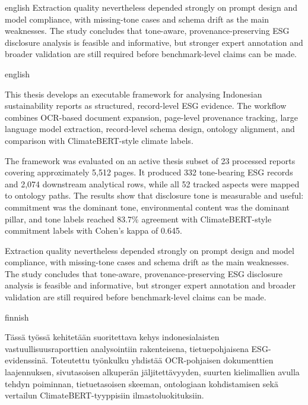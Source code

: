 \documentclass[english, online, cse, master]{dithesis}
\begin{document}
{\begin{thesisabstract}{english}
Extraction quality nevertheless depended strongly on prompt design and model
compliance, with missing-tone cases and schema drift as the main weaknesses.
The study concludes that tone-aware, provenance-preserving ESG disclosure
analysis is feasible and informative, but stronger expert annotation and
broader validation are still required before benchmark-level claims can be
made.
\end{thesisabstract}
} {

\begin{thesisabstract}{english}
  \abstractmetadata

This thesis develops an executable framework for analysing Indonesian
sustainability reports as structured, record-level ESG evidence. The workflow
combines OCR-based document expansion, page-level provenance tracking, large
language model extraction, record-level schema design, ontology alignment, and
comparison with ClimateBERT-style climate labels.

The framework was evaluated on an active thesis subset of 23 processed reports
covering approximately 5,512 pages. It produced 332 tone-bearing ESG records
and 2,074 downstream analytical rows, while all 52 tracked aspects were mapped
to ontology paths. The results show that disclosure tone is measurable and
useful: commitment was the dominant tone, environmental content was the
dominant pillar, and tone labels reached 83.7\% agreement with
ClimateBERT-style commitment labels with Cohen's kappa of 0.645.

Extraction quality nevertheless depended strongly on prompt design and model
compliance, with missing-tone cases and schema drift as the main weaknesses.
The study concludes that tone-aware, provenance-preserving ESG disclosure
analysis is feasible and informative, but stronger expert annotation and
broader validation are still required before benchmark-level claims can be
made.
\end{thesisabstract}
\begin{thesisabstract}{finnish}
\tiivistelmametadata

Tässä työssä kehitetään suoritettava kehys indonesialaisten
vastuullisuusraporttien analysointiin rakenteisena, tietuepohjaisena
ESG-evidenssinä. Toteutettu työnkulku yhdistää OCR-pohjaisen dokumenttien
laajennuksen, sivutasoisen alkuperän jäljitettävyyden, suurten kielimallien
avulla tehdyn poiminnan, tietuetasoisen skeeman, ontologiaan kohdistamisen
sekä vertailun ClimateBERT-tyyppisiin ilmastoluokituksiin.


\end{thesisabstract}}
\end{document}
